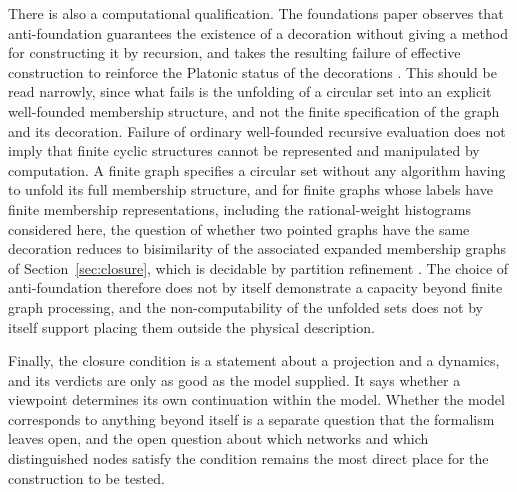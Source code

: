 \documentclass[11pt, a4paper]{article}
\theoremstyle{plain}
\theoremstyle{definition}
\theoremstyle{remark}
\begin{document}
There is also a computational qualification. The foundations paper observes that anti-foundation guarantees the existence of a decoration without giving a method for constructing it by recursion, and takes the resulting failure of effective construction to reinforce the Platonic status of the decorations \cite{mz2009}. This should be read narrowly, since what fails is the unfolding of a circular set into an explicit well-founded membership structure, and not the finite specification of the graph and its decoration. Failure of ordinary well-founded recursive evaluation does not imply that finite cyclic structures cannot be represented and manipulated by computation. A finite graph specifies a circular set without any algorithm having to unfold its full membership structure, and for finite graphs whose labels have finite membership representations, including the rational-weight histograms considered here, the question of whether two pointed graphs have the same decoration reduces to bisimilarity of the associated expanded membership graphs of Section~\ref{sec:closure}, which is decidable by partition refinement \cite{paige1987}. The choice of anti-foundation therefore does not by itself demonstrate a capacity beyond finite graph processing, and the non-computability of the unfolded sets does not by itself support placing them outside the physical description.

Finally, the closure condition is a statement about a projection and a dynamics, and its verdicts are only as good as the model supplied. It says whether a viewpoint determines its own continuation within the model. Whether the model corresponds to anything beyond itself is a separate question that the formalism leaves open, and the open question about which networks and which distinguished nodes satisfy the condition remains the most direct place for the construction to be tested.
\end{document}
